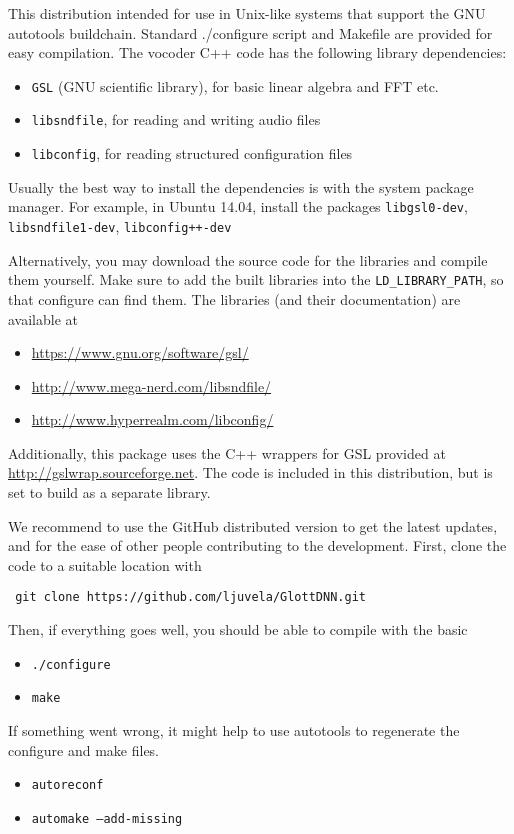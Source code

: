 \documentclass[a4paper, 11pt]{article}
\begin{document}
This distribution intended for use in Unix-like systems that support the GNU autotools buildchain. Standard ./configure script and Makefile are provided for easy compilation.
%
The vocoder C++ code has the following library dependencies:

\begin{itemize}
	\item \texttt{GSL} (GNU scientific library), for basic linear algebra and FFT etc.
	\item \texttt{libsndfile}, for reading and writing audio files
	\item \texttt{libconfig}, for reading structured configuration files
\end{itemize}
%
Usually the best way to install the dependencies is with the system package manager. For example, in Ubuntu 14.04, install the packages \texttt{libgsl0-dev}, \texttt{libsndfile1-dev}, \texttt{libconfig++-dev}


Alternatively, you may download the source code for the libraries and compile them yourself. Make sure to add the built libraries into the \texttt{LD\_LIBRARY\_PATH},
 so that configure can find them. The libraries (and their documentation) are available at 
%
\begin{itemize}
	\item[] \href{https://www.gnu.org/software/gsl/}{https://www.gnu.org/software/gsl/}
	\item[] \href{http://www.mega-nerd.com/libsndfile/}{http://www.mega-nerd.com/libsndfile/}
	\item[] \href{http://www.hyperrealm.com/libconfig/ }{http://www.hyperrealm.com/libconfig/}
\end{itemize}
%
Additionally, this package uses the C++ wrappers for GSL provided at 
\href{http://gslwrap.sourceforge.net}{http://gslwrap.sourceforge.net}. The code is included in this distribution, but is set to build as a separate library.


We recommend to use the GitHub distributed version to get the latest updates, and for the ease of other people contributing to the development. First, clone the code to a suitable location with

\texttt{
git clone https://github.com/ljuvela/GlottDNN.git 
}

Then, if everything goes well, you should be able to compile with the basic 
\begin{itemize}
	 \item[]\texttt{./configure}
	 \item[]\texttt{make}
\end{itemize}
% 
If something went wrong, it might help to use autotools to regenerate the configure and make files.
\begin{itemize}
	 \item[]\texttt{autoreconf}
	 \item[]\texttt{automake --add-missing}
\end{itemize}
\end{document}
